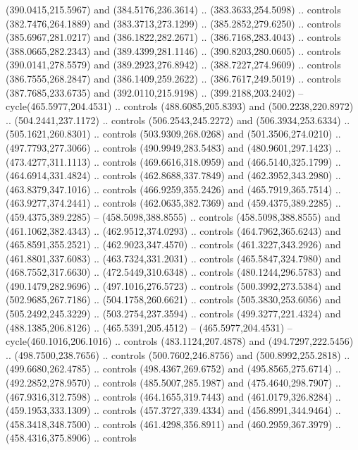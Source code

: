 \begin{scope}[cm={{1.25,0.0,0.0,-1.25,(0.0,743.43331)}}]
    (390.0415,215.5967) and (384.5176,236.3614) .. (383.3633,254.5098) .. controls
    (382.7476,264.1889) and (383.3713,273.1299) .. (385.2852,279.6250) .. controls
    (385.6967,281.0217) and (386.1822,282.2671) .. (386.7168,283.4043) .. controls
    (388.0665,282.2343) and (389.4399,281.1146) .. (390.8203,280.0605) .. controls
    (390.0141,278.5579) and (389.2923,276.8942) .. (388.7227,274.9609) .. controls
    (386.7555,268.2847) and (386.1409,259.2622) .. (386.7617,249.5019) .. controls
    (387.7685,233.6735) and (392.0110,215.9198) .. (399.2188,203.2402) --
    cycle(465.5977,204.4531) .. controls (488.6085,205.8393) and
    (500.2238,220.8972) .. (504.2441,237.1172) .. controls (506.2543,245.2272) and
    (506.3934,253.6334) .. (505.1621,260.8301) .. controls (503.9309,268.0268) and
    (501.3506,274.0210) .. (497.7793,277.3066) .. controls (490.9949,283.5483) and
    (480.9601,297.1423) .. (473.4277,311.1113) .. controls (469.6616,318.0959) and
    (466.5140,325.1799) .. (464.6914,331.4824) .. controls (462.8688,337.7849) and
    (462.3952,343.2980) .. (463.8379,347.1016) .. controls (466.9259,355.2426) and
    (465.7919,365.7514) .. (463.9277,374.2441) .. controls (462.0635,382.7369) and
    (459.4375,389.2285) .. (459.4375,389.2285) -- (458.5098,388.8555) .. controls
    (458.5098,388.8555) and (461.1062,382.4343) .. (462.9512,374.0293) .. controls
    (464.7962,365.6243) and (465.8591,355.2521) .. (462.9023,347.4570) .. controls
    (461.3227,343.2926) and (461.8801,337.6083) .. (463.7324,331.2031) .. controls
    (465.5847,324.7980) and (468.7552,317.6630) .. (472.5449,310.6348) .. controls
    (480.1244,296.5783) and (490.1479,282.9696) .. (497.1016,276.5723) .. controls
    (500.3992,273.5384) and (502.9685,267.7186) .. (504.1758,260.6621) .. controls
    (505.3830,253.6056) and (505.2492,245.3229) .. (503.2754,237.3594) .. controls
    (499.3277,221.4324) and (488.1385,206.8126) .. (465.5391,205.4512) --
    (465.5977,204.4531) -- cycle(460.1016,206.1016) .. controls
    (483.1124,207.4878) and (494.7297,222.5456) .. (498.7500,238.7656) .. controls
    (500.7602,246.8756) and (500.8992,255.2818) .. (499.6680,262.4785) .. controls
    (498.4367,269.6752) and (495.8565,275.6714) .. (492.2852,278.9570) .. controls
    (485.5007,285.1987) and (475.4640,298.7907) .. (467.9316,312.7598) .. controls
    (464.1655,319.7443) and (461.0179,326.8284) .. (459.1953,333.1309) .. controls
    (457.3727,339.4334) and (456.8991,344.9464) .. (458.3418,348.7500) .. controls
    (461.4298,356.8911) and (460.2959,367.3979) .. (458.4316,375.8906) .. controls

\end{scope}
